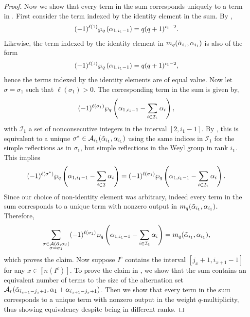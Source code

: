 \documentclass[10pt]{article}
\newcommand{\hr}[0]{\Tilde{\alpha}}
\newcommand{\newmu}[0]{\alpha_I}
\newcommand{\thealtset}[0]{\mathcal{A}(\hr,\newmu)}
\newcommand{\qpartition}[1]{\wp_q\left(#1\right)}
\begin{document}
\begin{proof}
    Now we show that every term in the sum  corresponds uniquely to a term in . First consider the term indexed by the identity element in the sum. By ,
    \begin{equation}
        (-1)^{\ell(1)}\qpartition{\alpha_{1,i_1-1}} = q(q+1)^{i_1-2}.\notag
    \end{equation}
    Likewise, the term indexed by the identity element in $m_q(\hr_{i_1},\alpha_{i_1})$ is also of the form
    \begin{equation}
        (-1)^{\ell(1)}\qpartition{\alpha_{1,i_1-1}}=q(q+1)^{i_1-2},\notag
    \end{equation}
    hence the terms indexed by the identity elements are of equal value. Now let $\sigma=\sigma_1$ such that $\ell(\sigma_1)>0$. The corresponding term in the sum is given by,
    \begin{equation}
        (-1)^{\ell(\sigma_1)}\qpartition{\alpha_{1,i_1-1}-\sum_{i\in\mathcal{I}_1}\alpha_i},\notag
    \end{equation}
    with $\mathcal{I}_1$ a set of nonconsecutive integers in the interval $[2,i_1-1]$. By , this is equivalent to a unique $\sigma^*\in\mathcal{A}_{i_1}(\hr_{i_1},\alpha_{i_1})$ using the same indices in $\mathcal{I}_1$ for the simple reflections as in $\sigma_1$, but simple reflections in the Weyl group in rank $i_1$. This implies 
    \begin{align}
        (-1)^{\ell(\sigma^*)}\qpartition{\alpha_{1,i_1-1}-\sum_{i\in\mathcal{I}}\alpha_i} = (-1)^{\ell(\sigma_1)}\qpartition{\alpha_{1,i_1-1}-\sum_{i\in\mathcal{I}_1}\alpha_i}.\notag
    \end{align}
    Since our choice of non-identity element was arbitrary, indeed every term in the sum corresponds to a unique term with nonzero output in $m_q(\hr_{i_1},\alpha_{i_1})$. Therefore, 
    \begin{equation}
        \sum_{\substack{\sigma\in\thealtset\\\sigma=\sigma_1}}(-1)^{\ell(\sigma_1)}\qpartition{\alpha_{1,i_1-1}-\sum_{i\in\mathcal{I}_1}\alpha_i}= m_q(\hr_{i_1},\alpha_{i_1}),\notag
    \end{equation}
    which proves the claim. 
    Now suppose $I^c$ contains the interval $[j_x+1,i_{x+1}-1]$ for any $x\in[n(I^c)]$.
    To prove the claim in , we show that the sum contains an equivalent number of terms to the size of the alternation set $\mathcal{A}_r(\hr_{i_{x+1}-j_x+1},\alpha_1+\alpha_{i_{x+1}-j_x+1})$. 
    Then we show that every term in the sum corresponds to a unique term with nonzero output in the weight $q$-multiplicity, thus showing equivalency despite being in different ranks.
    

\end{proof}
\end{document}
